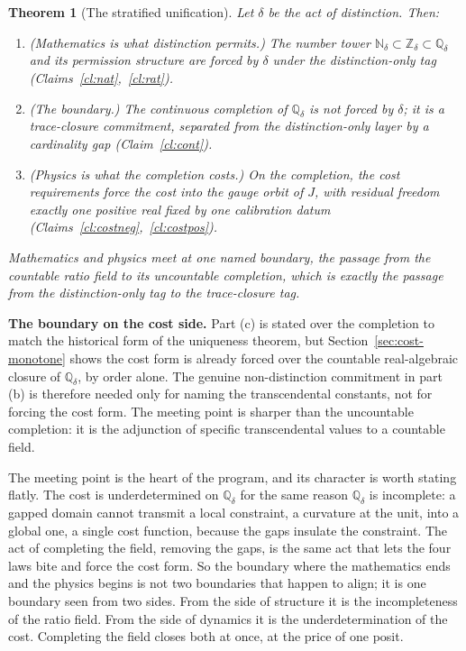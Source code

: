 \documentclass[11pt,a4paper]{article}
\newtheorem{theorem}{Theorem}[section]
\theoremstyle{definition}
\theoremstyle{remark}
\newcommand{\Ndelta}{\mathbb{N}_{\delta}}
\newcommand{\Zdelta}{\mathbb{Z}_{\delta}}
\newcommand{\Qdelta}{\mathbb{Q}_{\delta}}
\begin{document}
\begin{theorem}[The stratified unification]\label{thm:unif}
Let $\delta$ be the act of distinction. Then:
\begin{enumerate}[leftmargin=2em, label=\textup{(\alph*)}]
  \item \textup{(Mathematics is what distinction permits.)} The number tower
    $\Ndelta \subset \Zdelta \subset \Qdelta$ and its permission structure are
    forced by $\delta$ under the distinction-only tag
    \textup{(Claims~\ref{cl:nat},~\ref{cl:rat})}.
  \item \textup{(The boundary.)} The continuous completion of $\Qdelta$ is not
    forced by $\delta$; it is a trace-closure commitment, separated from the
    distinction-only layer by a cardinality gap \textup{(Claim~\ref{cl:cont})}.
  \item \textup{(Physics is what the completion costs.)} On the completion, the
    cost requirements force the cost into the gauge orbit of $J$, with residual
    freedom exactly one positive real fixed by one calibration datum
    \textup{(Claims~\ref{cl:costneg},~\ref{cl:costpos})}.
\end{enumerate}
Mathematics and physics meet at one named boundary, the passage from the countable
ratio field to its uncountable completion, which is exactly the passage from the
distinction-only tag to the trace-closure tag.
\end{theorem}

\medskip
\noindent\textbf{The boundary on the cost side.} Part (c) is stated over the
completion to match the historical form of the uniqueness theorem, but
Section~\ref{sec:cost-monotone} shows the cost form is already forced over the
countable real-algebraic closure of $\Qdelta$, by order alone. The genuine
non-distinction commitment in part (b) is therefore needed only for naming the
transcendental constants, not for forcing the cost form. The meeting point is
sharper than the uncountable completion: it is the adjunction of specific
transcendental values to a countable field.

The meeting point is the heart of the program, and its character is worth stating
flatly. The cost is underdetermined on $\Qdelta$ for the same reason $\Qdelta$ is
incomplete: a gapped domain cannot transmit a local constraint, a curvature at the
unit, into a global one, a single cost function, because the gaps insulate the
constraint. The act of completing the field, removing the gaps, is the same act
that lets the four laws bite and force the cost form. So the boundary where the
mathematics ends and the physics begins is not two boundaries that happen to
align; it is one boundary seen from two sides. From the side of structure it is the
incompleteness of the ratio field. From the side of dynamics it is the
underdetermination of the cost. Completing the field closes both at once, at the
price of one posit.
\end{document}
